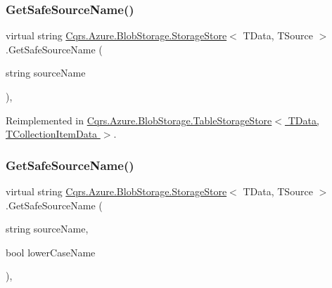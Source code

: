 \mbox{\label{classCqrs_1_1Azure_1_1BlobStorage_1_1StorageStore_a3ed119d808d9b29e99b1c6c983831482}} 
\subsubsection{\texorpdfstring{Get\+Safe\+Source\+Name()}{GetSafeSourceName()}\hspace{0.1cm}{\footnotesize\ttfamily [1/2]}}
{\footnotesize\ttfamily virtual string \hyperlink{classCqrs_1_1Azure_1_1BlobStorage_1_1StorageStore}{Cqrs.\+Azure.\+Blob\+Storage.\+Storage\+Store}$<$ T\+Data, T\+Source $>$.Get\+Safe\+Source\+Name (\begin{DoxyParamCaption}\item[{string}]{source\+Name }\end{DoxyParamCaption})\hspace{0.3cm}{\ttfamily [protected]}, {\ttfamily [virtual]}}



Reimplemented in \hyperlink{classCqrs_1_1Azure_1_1BlobStorage_1_1TableStorageStore_a7b9e49aa8017ff3c55b184b956a150d0}{Cqrs.\+Azure.\+Blob\+Storage.\+Table\+Storage\+Store$<$ T\+Data, T\+Collection\+Item\+Data $>$}.

\mbox{\label{classCqrs_1_1Azure_1_1BlobStorage_1_1StorageStore_ad3364a0c84d5ed666615b9528d6f640e}} 
\subsubsection{\texorpdfstring{Get\+Safe\+Source\+Name()}{GetSafeSourceName()}\hspace{0.1cm}{\footnotesize\ttfamily [2/2]}}
{\footnotesize\ttfamily virtual string \hyperlink{classCqrs_1_1Azure_1_1BlobStorage_1_1StorageStore}{Cqrs.\+Azure.\+Blob\+Storage.\+Storage\+Store}$<$ T\+Data, T\+Source $>$.Get\+Safe\+Source\+Name (\begin{DoxyParamCaption}\item[{string}]{source\+Name,  }\item[{bool}]{lower\+Case\+Name }\end{DoxyParamCaption})\hspace{0.3cm}{\ttfamily [protected]}, {\ttfamily [virtual]}}

